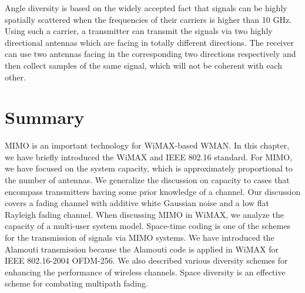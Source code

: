 Angle diversity is based on the widely accepted fact that signals
can be highly spatially scattered when the frequencies of their
carriers is higher than 10 GHz. Using such a carrier, a transmitter
can transmit the signals via two highly directional antennas which
are facing in totally different directions. The receiver can use two
antennas facing in the corresponding two directions respectively and
then collect samples of the same signal, which will not be coherent
with each other.

\section{Summary}

MIMO is an important technology for WiMAX-based WMAN. In this
chapter, we have briefly introduced the WiMAX and IEEE 802.16
standard. For MIMO, we have focused on the system capacity, which is
approximately proportional to the number of antennas. We generalize
the discussion on capacity to cases that encompass transmitters
having some prior knowledge of a channel. Our discussion covers a
fading channel with additive white Gaussian noise and a low flat
Rayleigh fading channel. When discussing MIMO in WiMAX, we analyze
the capacity of a multi-user system model. Space-time coding is one
of the schemes for the transmission of signals via MIMO systems. We
have introduced the Alamouti transmission because the Alamouti code
is applied in WiMAX for IEEE 802.16-2004 OFDM-256. We also described
various diversity schemes for enhancing the performance of wireless
channels. Space diversity is an effective scheme for combating
multipath fading.

